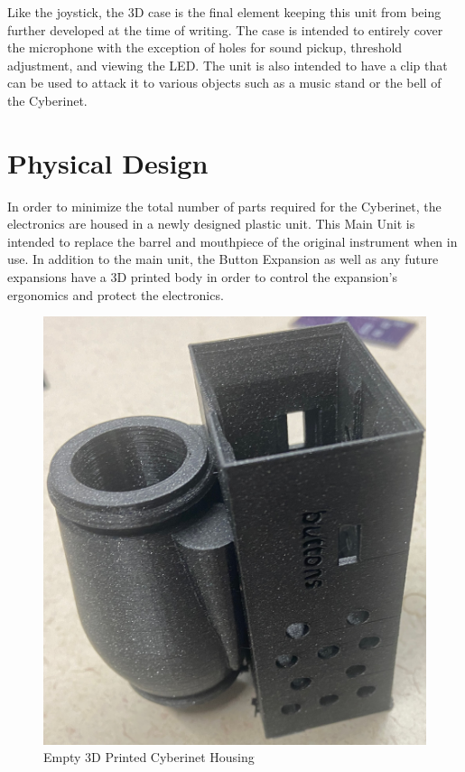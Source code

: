 Like the joystick, the 3D case is the final element keeping this unit from being further developed at the time of writing. The case is intended to entirely cover the microphone with the exception of holes for sound pickup, threshold adjustment, and viewing the LED. The unit is also intended to have a clip that can be used to attack it to various objects such as a music stand or the bell of the Cyberinet.

\section{Physical Design}
In order to minimize the total number of parts required for the Cyberinet, the electronics are housed in a newly designed plastic unit. This Main Unit is intended to replace the barrel and mouthpiece of the original instrument when in use. In addition to the main unit, the Button Expansion as well as any future expansions have a 3D printed body in order to control the expansion's ergonomics and protect the electronics.

\begin{center}
    \begin{figure}
        \centering
        \includegraphics[scale=0.1]{diagrams/builtUnits/emptyCase.JPG}
        \caption{Empty 3D Printed Cyberinet Housing}
        \label{fig:cybernetCase}
    \end{figure}
\end{center}

